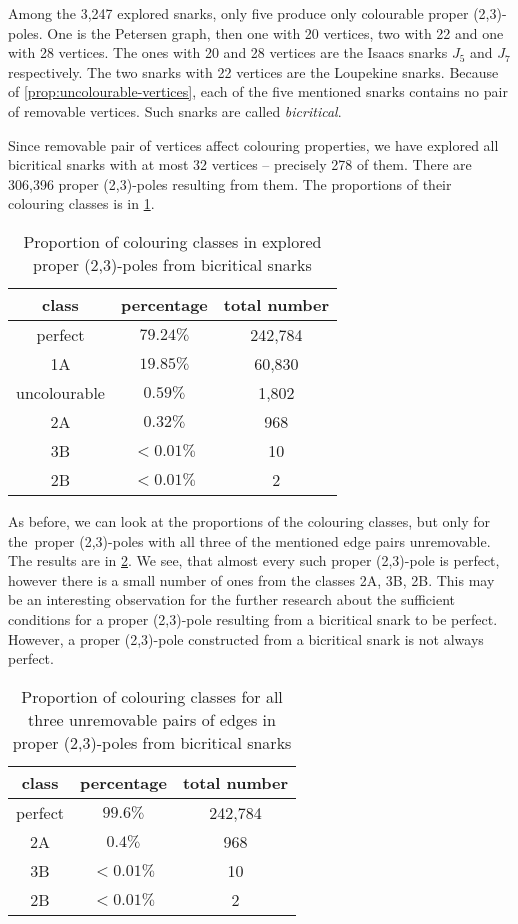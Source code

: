 Among the 3,247 explored snarks, only five produce only colourable proper (2,3)-poles. One is the Petersen graph, then one with 20 vertices, two with 22 and one with 28 vertices. The ones with 20 and 28 vertices are the Isaacs snarks $J_5$ and $J_7$ respectively. The two snarks with 22 vertices are the Loupekine snarks. Because of \cref{prop:uncolourable-vertices}, each of the five mentioned snarks contains no pair of removable vertices. Such snarks are called \textit{bicritical}.

Since removable pair of vertices affect colouring properties, we have explored all bicritical snarks with at most 32 vertices -- precisely 278 of them. There are 306,396 proper (2,3)-poles resulting from them. The proportions of their colouring classes is in \cref{tab:proportion-bicritical}.

\begin{table}[h!]
	\centering
	\begin{tabular}{ |c|c|c| } 
		\hline
		class & percentage & total number \\ [0.5ex] 
		\hline\hline
		perfect & $79.24\%$ & 242,784 \\ 
		\hline
		1A & $19.85\%$ & 60,830 \\ 
		\hline
		uncolourable & $0.59\%$ & 1,802 \\ 
		\hline
		2A & $0.32\%$ & 968 \\ 
		\hline
		3B & $< 0.01\%$ & 10 \\ 
		\hline
		2B & $< 0.01\%$ & 2 \\ 
		\hline
	\end{tabular}
	\caption{Proportion of colouring classes in explored proper (2,3)-poles from bicritical snarks}
	\label{tab:proportion-bicritical}
\end{table}

As before, we can look at the proportions of the colouring classes, but only for the~proper (2,3)-poles with all three of the mentioned edge pairs unremovable. The results are in \cref{tab:proportion-bicritical-all-unremovable}. We see, that almost every such proper (2,3)-pole is perfect, however there is a small number of ones from the classes 2A, 3B, 2B. This may be an interesting observation for the further research about the sufficient conditions for a proper (2,3)-pole resulting from a bicritical snark to be perfect. However, a proper (2,3)-pole constructed from a bicritical snark is not always perfect.

\begin{table}[h!]
	\centering
	\begin{tabular}{ |c|c|c| } 
		\hline
		class & percentage & total number \\ [0.5ex] 
		\hline\hline
		perfect & $99.6\%$ & 242,784 \\ 
		\hline
		2A & $0.4\%$ & 968 \\ 
		\hline
		3B & $< 0.01\%$ & 10 \\ 
		\hline
		2B & $< 0.01\%$ & 2 \\ 
		\hline
	\end{tabular}
	\caption{Proportion of colouring classes for all three unremovable pairs of edges in proper (2,3)-poles from bicritical snarks}
	\label{tab:proportion-bicritical-all-unremovable}
\end{table}
